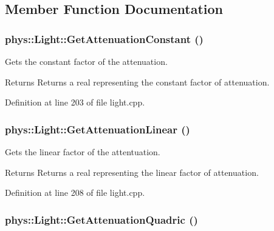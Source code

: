 \subsection{Member Function Documentation}
\hypertarget{classphys_1_1Light_afc87c26ec4500caf94c6210329c091f9}{
\subsubsection[{GetAttenuationConstant}]{ phys::Light::GetAttenuationConstant ()}}
\label{dc/df1/classphys_1_1Light_afc87c26ec4500caf94c6210329c091f9}


Gets the constant factor of the attenuation. 

\begin{DoxyReturn}{Returns}
Returns a real representing the constant factor of attenuation. 
\end{DoxyReturn}


Definition at line 203 of file light.cpp.

\hypertarget{classphys_1_1Light_acd3d3a2cf672fe18bd9e6d47676c2387}{
\subsubsection[{GetAttenuationLinear}]{ phys::Light::GetAttenuationLinear ()}}
\label{dc/df1/classphys_1_1Light_acd3d3a2cf672fe18bd9e6d47676c2387}


Gets the linear factor of the attentuation. 

\begin{DoxyReturn}{Returns}
Returns a real representing the linear factor of attenuation. 
\end{DoxyReturn}


Definition at line 208 of file light.cpp.

\hypertarget{classphys_1_1Light_a25d32e506ed943e8f5571edbaf2d16d6}{
\subsubsection[{GetAttenuationQuadric}]{ phys::Light::GetAttenuationQuadric ()}}
\label{dc/df1/classphys_1_1Light_a25d32e506ed943e8f5571edbaf2d16d6}


